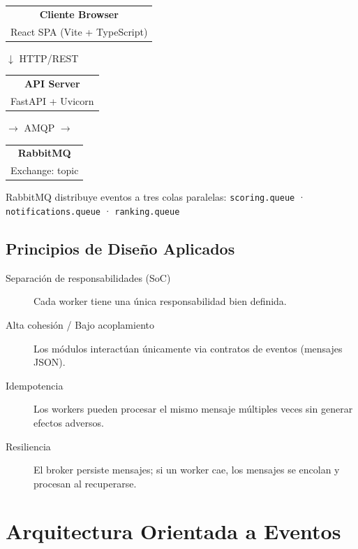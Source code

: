 \documentclass[12pt,a4paper]{article}
\newcommand{\event}[1]{\texttt{\small\color{accent}#1}}
\begin{document}
\begin{center}
\begin{tabular}{|c|}
  \hline
  \textbf{Cliente Browser} \\
  React SPA (Vite + TypeScript) \\
  \hline
\end{tabular}
$\downarrow$ HTTP/REST
\begin{tabular}{|c|}
  \hline
  \textbf{API Server} \\
  FastAPI + Uvicorn \\
  \hline
\end{tabular}
$\rightarrow$ AMQP $\rightarrow$
\begin{tabular}{|c|}
  \hline
  \textbf{RabbitMQ} \\
  Exchange: topic \\
  \hline
\end{tabular}

\vspace{0.5cm}
\small
RabbitMQ distribuye eventos a tres colas paralelas:
\event{scoring.queue} · \event{notifications.queue} · \event{ranking.queue}
\end{center}

\subsection{Principios de Diseño Aplicados}

\begin{description}
  \item[Separación de responsabilidades (SoC)] Cada worker tiene una única responsabilidad bien definida.
  \item[Alta cohesión / Bajo acoplamiento] Los módulos interactúan únicamente via contratos de eventos (mensajes JSON).
  \item[Idempotencia] Los workers pueden procesar el mismo mensaje múltiples veces sin generar efectos adversos.
  \item[Resiliencia] El broker persiste mensajes; si un worker cae, los mensajes se encolan y procesan al recuperarse.
\end{description}

\section{Arquitectura Orientada a Eventos}
\end{document}
